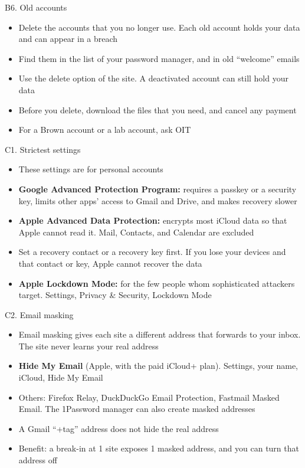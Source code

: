 \documentclass[11pt]{beamer}
\newcommand{\vfy}{\unskip}
\newcommand{\vfy}{\unskip\nobreakspace{\scriptsize\textcolor{citecol}{[verify]}}}
\begin{document}
\begin{frame}{B6. Old accounts}
\pause
\begin{itemize}\setlength\itemsep{10pt}
\item Delete the accounts that you no longer use. Each old account holds your data and can appear in a breach \pause
\item Find them in the list of your password manager, and in old ``welcome'' emails \pause
\item Use the delete option of the site. A deactivated account can still hold your data \pause
\item Before you delete, download the files that you need, and cancel any payment \pause
\item For a Brown account or a lab account, ask OIT
\end{itemize}
\end{frame}


\begin{frame}{C1. Strictest settings}
\pause
\begin{itemize}\setlength\itemsep{7pt}
\item These settings are for personal accounts \pause
\item \textbf{Google Advanced Protection Program:} requires a passkey or a security key, limits other apps' access to Gmail and Drive, and makes recovery slower \vfy \pause
\item \textbf{Apple Advanced Data Protection:} encrypts most iCloud data so that Apple cannot read it. Mail, Contacts, and Calendar are excluded \vfy \pause
\item Set a recovery contact or a recovery key first. If you lose your devices and that contact or key, Apple cannot recover the data \vfy \pause
\item \textbf{Apple Lockdown Mode:} for the few people whom sophisticated attackers target. Settings, Privacy \& Security, Lockdown Mode \vfy
\end{itemize}
\end{frame}


\begin{frame}{C2. Email masking}
\pause
\begin{itemize}\setlength\itemsep{9pt}
\item Email masking gives each site a different address that forwards to your inbox. The site never learns your real address \pause
\item \textbf{Hide My Email} (Apple, with the paid iCloud+ plan). Settings, your name, iCloud, Hide My Email \vfy \pause
\item Others: Firefox Relay, DuckDuckGo Email Protection, Fastmail Masked Email. The 1Password manager can also create masked addresses \vfy \pause
\item A Gmail ``+tag'' address does not hide the real address \pause
\item Benefit: a break-in at 1 site exposes 1 masked address, and you can turn that address off
\end{itemize}
\end{frame}
\end{document}
